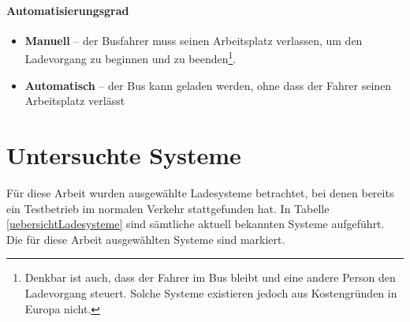 \paragraph{Automatisierungsgrad}
\begin{itemize}
	\item \textbf{Manuell} – der Busfahrer muss seinen Arbeitsplatz verlassen, um den Ladevorgang zu beginnen und zu beenden\footnote{Denkbar ist auch, dass der Fahrer im Bus bleibt und eine andere Person den Ladevorgang steuert. Solche Systeme existieren jedoch aus Kostengründen in Europa nicht.}.
	\item \textbf{Automatisch} – der Bus kann geladen werden, ohne dass der Fahrer seinen Arbeitsplatz verlässt
\end{itemize}

\section{Untersuchte Systeme}
\label{untersuchte_Systeme}
Für diese Arbeit wurden ausgewählte Ladesysteme betrachtet, bei denen bereits ein Testbetrieb im normalen Verkehr stattgefunden hat. In Tabelle \ref{uebersichtLadesysteme} sind sämtliche aktuell bekannten Systeme aufgeführt. Die für diese Arbeit ausgewählten Systeme sind markiert.


